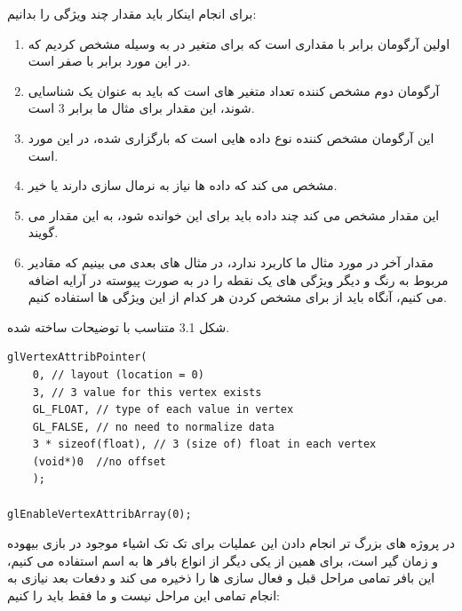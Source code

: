 \documentclass[a4paper, 12pt]{book}
\newcommand{\lrit}[1]{\lr{\textit{#1}}}
\begin{document}
    برای انجام اینکار باید مقدار چند ویژگی را بدانیم:
\begin{persian}
    \begin{enumerate}
      \item اولین آرگومان برابر با مقداری است که برای متغیر  در  به وسیله  مشخص کردیم که در این مورد برابر با صفر است.
      \item آرگومان دوم مشخص کننده تعداد متغیر های است که باید به عنوان یک  شناسایی شوند، این مقدار برای مثال ما برابر 3 است.
      \item این آرگومان مشخص کننده نوع داده هایی است که بارگزاری شده، در این مورد  است.
      \item مشخص می کند که داده ها نیاز به نرمال سازی دارند یا خیر.
      \item این مقدار مشخص می کند چند  داده باید برای این  خوانده شود، به این مقدار  می گویند.
      \item مقدار آخر در مورد مثال ما کاربرد ندارد، در مثال های بعدی می بینیم که مقادیر مربوط به رنگ و دیگر ویژگی های یک نقطه را در به صورت پیوسته در آرایه  اضافه می کنیم، آنگاه باید از  برای مشخص کردن هر کدام از این ویژگی ها استفاده کنیم.
    \end{enumerate}
\end{persian}

    شکل 3.1 متناسب با توضیحات ساخته شده.

    \begin{LTR}
    \small
        \begin{lstlisting}[style=C++Style,caption=\lrit{link vertex attribute to vertex data}]
glVertexAttribPointer(
    0, // layout (location = 0)
    3, // 3 value for this vertex exists
    GL_FLOAT, // type of each value in vertex
    GL_FALSE, // no need to normalize data
    3 * sizeof(float), // 3 (size of) float in each vertex
    (void*)0  //no offset
    );

glEnableVertexAttribArray(0);
        \end{lstlisting}
    \end{LTR}
    \normalsize
    \vspace*{0.3cm}

    در پروژه های بزرگ تر انجام دادن این عملیات برای تک تک اشیاء موجود در بازی بیهوده و زمان گیر است، برای همین از یکی دیگر از انواع بافر ها به اسم  استفاده می کنیم، این بافر تمامی مراحل قبل و فعال سازی  ها را ذخیره می کند و دفعات بعد نیازی به انجام تمامی این مراحل نیست و ما فقط باید  را  کنیم:
\end{document}
